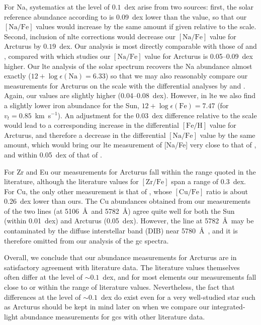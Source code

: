 \documentclass{aa}
\begin{document}
For Na, systematics at the level of $0.1$~dex arise from two sources: first, the solar reference abundance according to  is 0.09~dex lower than the  value, so that our $\mathrm{[Na/Fe]}$ values would increase by the same amount if given relative to the  scale. Second, inclusion of \ac{nlte} corrections would decrease our $\mathrm{[Na/Fe]}$ value for Arcturus by $0.19$~dex. Our analysis is most directly comparable with those of  and , compared with which studies our $\mathrm{[Na/Fe]}$ value for Arcturus is 0.05--0.09~dex higher.  Our \ac{lte} analysis of the solar spectrum recovers the  Na abundance almost exactly ($12+\log \epsilon (\mathrm{Na}) = 6.33$) so that we may also reasonably compare our measurements for Arcturus on the  scale with the differential analyses by  and . Again, our values are slightly higher (0.04--0.08~dex). However, in \ac{lte} we also find a slightly lower iron abundance for the Sun, $12 + \log \epsilon(\mathrm{Fe}) = 7.47$ (for $v_t=0.85$~km~s$^{-1}$). An 
adjustment for the 0.03~dex difference relative to the  scale would lead to a corresponding increase in the differential $\mathrm{[Fe/H]}$ value for Arcturus, and therefore a decrease in the differential $\mathrm{[Na/Fe]}$ value by the same amount, which would bring our \ac{lte} measurement of [Na/Fe] very close to that of , and within 0.05~dex of that of .

For Zr and Eu our measurements for Arcturus fall within the range quoted in the literature, although the literature values for $\mathrm{[Zr/Fe]}$ span a range of 0.3~dex. For Cu, the only other measurement is that of , whose $\mathrm{[Cu/Fe]}$ ratio is about 0.26~dex lower than ours.  The Cu abundances obtained from our measurements of the two  lines (at 5106~\AA\ and 5782~\AA) agree quite well for both the Sun (within 0.01~dex) and Arcturus (0.05~dex). However, the  line at 5782~\AA\ may be contaminated by the diffuse interstellar band (DIB) near 5780~\AA\ \citep{Herbig1975}, and it is therefore omitted from our analysis of the \ac{gc} spectra. 

Overall, we conclude that our abundance measurements for Arcturus are in satisfactory agreement with literature data. The literature values themselves often differ at the level of $\sim0.1$~dex, and for most elements our measurements fall close to or within the range of literature values. Nevertheless, the fact that differences at the level of $\sim0.1$~dex do exist even for a very well-studied star such as Arcturus should be kept in mind later on when we compare our integrated-light abundance measurements for \acp{gc} with other literature data. 
\end{document}
